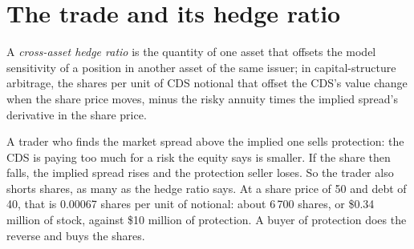 \begin{omfigure}

\label{fig:s2:capital-structure-arbitrage:curve}
\end{omfigure}

\section{The trade and its hedge ratio}

\begin{definition}\label{def:s2:capital-structure-arbitrage:hedge}
A \emph{cross-asset hedge ratio} is the quantity of one asset that offsets the model sensitivity of a position in
another asset of the same issuer; in capital-structure arbitrage, the shares per unit of CDS notional that offset the CDS's value change when the
share price moves, minus the risky annuity times the implied spread's derivative in the share price.
\end{definition}

A trader who finds the market spread above the implied one sells protection: the CDS is paying too much for a risk the equity says is smaller. If the
share then falls, the implied spread rises and the protection seller loses. So the trader also shorts shares, as many as the hedge ratio says. At a
share price of 50 and debt of 40, that is 0.00067 shares per unit of notional: about 6\,700 shares, or \$0.34 million of stock, against \$10 million of
protection. A buyer of protection does the reverse and buys the shares.

